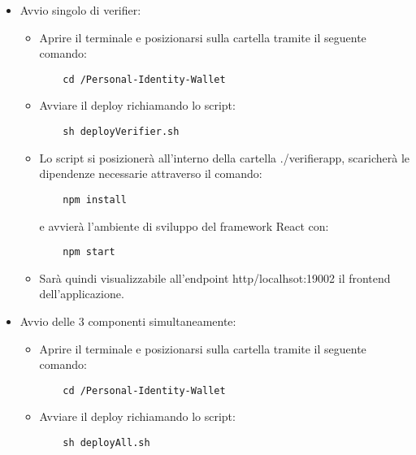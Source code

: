 \begin{itemize}
\item Avvio singolo di verifier:
\begin{itemize}
\item Aprire il terminale e posizionarsi sulla cartella tramite il seguente comando: 
\begin{verbatim}
    cd /Personal-Identity-Wallet
\end{verbatim}
\item Avviare il deploy richiamando lo script: 
\begin{verbatim}
    sh deployVerifier.sh
\end{verbatim}
\item Lo script si posizionerà all'interno della cartella ./verifierapp, scaricherà le dipendenze necessarie attraverso il comando: 
\begin{verbatim}
    npm install
\end{verbatim}
 e avvierà l’ambiente di sviluppo del framework React con:
\begin{verbatim}
    npm start
\end{verbatim}

\item Sarà quindi visualizzabile all'endpoint http/localhsot:19002 il frontend dell'applicazione.
\end{itemize}

\item Avvio delle 3 componenti simultaneamente:
\begin{itemize}
\item Aprire il terminale e posizionarsi sulla cartella tramite il seguente comando: 
\begin{verbatim}
    cd /Personal-Identity-Wallet
\end{verbatim}
\item Avviare il deploy richiamando lo script: 
\begin{verbatim}
    sh deployAll.sh
\end{verbatim}
\end{itemize}
\end{itemize}

